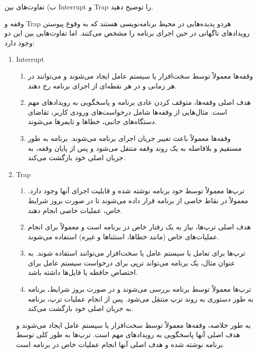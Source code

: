 ب) تفاوت‌های بین Interrupt و Trap را توضیح دهید.
\begin{qsolve}
وقفه و Trap هردو پدیده‌هایی در محیط برنامه‌نویسی هستند که به وقوع پیوستن رویدادهای ناگهانی در حین اجرای برنامه را مشخص می‌کنند. اما تفاوت‌هایی بین این دو وجود دارد:
\begin{enumerate}
	\item Interrupt
	\begin{enumerate}
		\item وقفه‌ها معمولاً توسط سخت‌افزار یا سیستم عامل ایجاد می‌شوند و می‌توانند در هر زمانی و در هر نقطه‌ای از اجرای برنامه رخ دهند.
		\item هدف اصلی وقفه‌ها، متوقف کردن عادی برنامه و پاسخگویی به رویدادهای مهم است. مثال‌هایی از وقفه‌ها شامل درخواست‌های ورودی کاربر، تقاضای دستگاه‌های جانبی، خطاها و تایمرها می‌شوند.
		\item وقفه‌ها معمولاً باعث تغییر جریان اجرای برنامه می‌شوند. برنامه به طور مستقیم و بلافاصله به یک روند وقفه منتقل می‌شود و پس از پایان وقفه، به جریان اصلی خود بازگشت می‌کند.
	\end{enumerate}
	\item Trap
	\begin{enumerate}
		\item ترپ‌ها معمولاً توسط خود برنامه نوشته شده و قابلیت اجرای آنها وجود دارد. معمولاً در نقاط خاصی از برنامه قرار داده می‌شوند تا در صورت بروز شرایط خاص، عملیات خاصی انجام دهند.
		\item هدف اصلی ترپ‌ها، نیاز به یک رفتار خاص در برنامه است و معمولاً برای انجام عملیات‌های خاص (مانند خطاها، استثناها و غیره) استفاده می‌شوند.
		\item ترپ‌ها برای تعامل با سیستم عامل یا سخت‌افزار می‌توانند استفاده شوند. به عنوان مثال، یک برنامه می‌تواند ترپی برای درخواست سیستم عامل برای اختصاص حافظه یا فایل‌ها داشته باشد.
		\item ترپ‌ها معمولاً توسط برنامه بررسی می‌شوند و در صورت بروز شرایط، برنامه به طور دستوری به روند ترپ منتقل می‌شود. پس از انجام عملیات ترپ، برنامه به جریان اصلی خود بازگشت می‌کند.
	\end{enumerate}
	به طور خلاصه، وقفه‌ها معمولاً توسط سخت‌افزار یا سیستم عامل ایجاد می‌شوند و هدف اصلی آنها پاسخگویی به رویدادهای مهم است. ترپ‌ها به طور کلی توسط برنامه نوشته شده و هدف اصلی آنها انجام عملیات خاص در برنامه است.
\end{enumerate}
\end{qsolve}
\newpage






